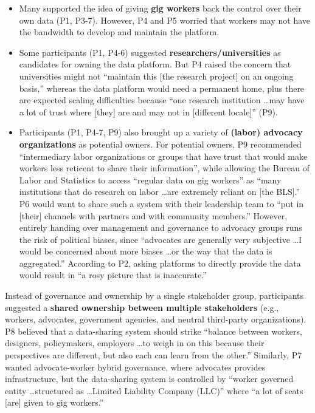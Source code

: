 \begin{itemize}
    \item Many supported the idea of giving \textbf{gig workers} back the control over their own data (P1, P3-7). However, P4 and P5 worried that workers may not have the bandwidth to develop and maintain the platform. 
\item Some participants (P1, P4-6) suggested \textbf{researchers/universities} as candidates for owning the data platform. But P4 raised the concern that universities might not ``maintain this [the research project] on an ongoing basis,'' whereas the data platform would need a permanent home, plus there are expected scaling difficulties because ``one research institution \dots may have a lot of trust where [they] are and may not in [different locale]'' (P9).  
\item Participants (P1, P4-7, P9) also brought up a variety of \textbf{(labor) advocacy organizations} as potential owners. For potential owners, P9 recommended ``intermediary labor organizations or groups that have trust that would make workers less reticent to share their information'', while allowing the Bureau of Labor and Statistics to access ``regular data on gig workers'' as ``many institutions that do research on labor  \dots are extremely reliant on [the BLS].''
P6 would want to share such a system with their leadership team to ``put in [their] channels with partners and with community members.'' However, entirely handing over management and governance to advocacy groups runs the risk of political biases, since ``advocates are generally very subjective \dots I would be concerned about more biases \dots or the way that the data is aggregated.''
According to P2, asking platforms to directly provide the data would result in ``a rosy picture that is inaccurate.'' 

\end{itemize} 

Instead of governance and ownership by a single stakeholder group, participants suggested a \textbf{shared ownership between multiple stakeholders} (e.g., workers, advocates, government agencies, and neutral third-party organizations). P8 believed that a data-sharing system {should strike} ``balance between workers, designers, policymakers, employers \dots to weigh in on this because their perspectives are different, but also each can learn from the other.'' 
Similarly, P7 wanted advocate-worker hybrid governance, where advocates provides infrastructure, but the data-sharing system is controlled by ``worker governed entity  \dots structured as  \dots  Limited Liability Company (LLC)'' where ``a lot of seats [are] given to gig workers.'' 
\vspace{2em}

